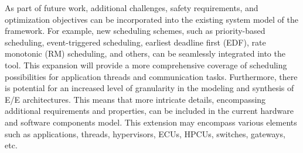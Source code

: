     As part of future work, additional challenges, safety requirements, and optimization objectives can be incorporated into the existing system model of the framework. For example, new scheduling schemes, such as priority-based scheduling, event-triggered scheduling, earliest deadline first (EDF), rate monotonic (RM) scheduling, and others, can be seamlessly integrated into the tool. This expansion will provide a more comprehensive coverage of scheduling possibilities for application threads and communication tasks.
    Furthermore, there is potential for an increased level of granularity in the modeling and synthesis of E/E architectures. This means that more intricate details, encompassing additional requirements and properties, can be included in the current hardware and software components model. This extension may encompass various elements such as applications, threads, hypervisors, ECUs, HPCUs, switches, gateways, etc.
    
    
    
    
    
    
    

